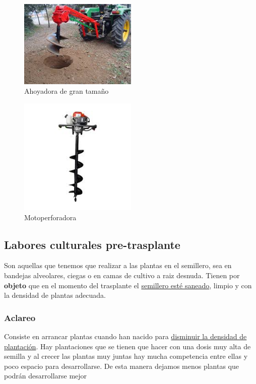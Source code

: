 \documentclass[a4paper,12pt,oneside]{article}
\begin{document}
\begin{enumerate}
\begin{center}
\begin{figure}[htbp]
\centering
\includegraphics[width=0.5\textwidth]{./img_uf1596/perf_tractor.jpg}
\caption{\label{fig:org516c917}
Ahoyadora de gran tamaño}
\end{figure}

\begin{figure}[htbp]
\centering
\includegraphics[width=0.5\textwidth]{./img_uf1596/motoperforadora.jpg}
\caption{\label{fig:orgcfcf2f0}
Motoperforadora}
\end{figure}
\end{center}
\end{enumerate}

\subsection{Labores culturales pre-trasplante}
\label{sec:orgbbc41ec}

Son aquellas que tenemos que realizar a las plantas en el semillero, sea en
bandejas alveolares, ciegas o en camas de cultivo a raiz desnuda. Tienen por
\textbf{objeto} que en el momento del trasplante el \uline{semillero esté saneado}, limpio y
con la densidad de plantas adecuada.  

\subsubsection{Aclareo}
\label{sec:org710defa}
Consiste en arrancar plantas cuando han nacido para \uline{disminuir la densidad de 
plantación}. Hay plantaciones que se tienen que hacer con una dosis muy alta de
semilla y al crecer las plantas muy juntas hay mucha competencia entre ellas y
poco espacio para desarrollarse. De esta manera dejamos menos plantas que podrán
desarrollarse mejor
\end{document}
